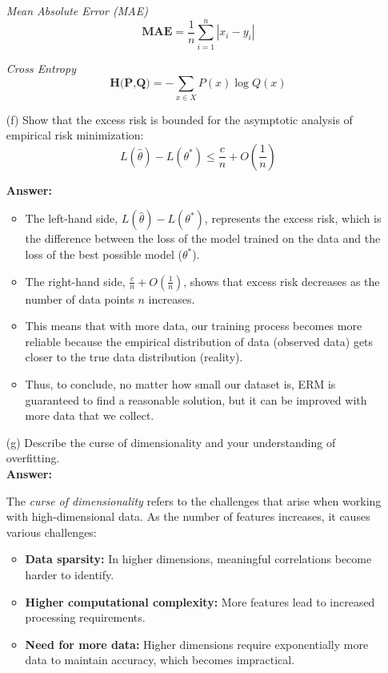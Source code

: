 \documentclass[12pt,letterpaper]{article}
\begin{document}
\begin{itemize}
    \textit{Mean Absolute Error (MAE)}
    \[
        \textbf{MAE} = \frac{1}{n}\sum_{i=1}^{n} \left\lvert x_i - y_i \right\rvert 
    \]
    
    \textit{Cross Entropy}
    \[
        \textbf{H(P,Q)} = -\sum_{x \in X} P(x) \log Q(x)
    \]
    
    \item[(f)] Show that the excess risk is bounded for the asymptotic analysis of empirical risk minimization:
    \[
        L(\hat{\theta}) - L(\theta^*) \leq \frac{c}{n} + O(\frac{1}{n})
    \]
    
    \textbf{Answer:}
    \begin{itemize}
        \item The left-hand side, \(L(\hat{\theta}) - L(\theta^*)\), represents the excess risk, which is the difference between the loss of the model trained on the data and the loss of the best possible model (\(\theta^*\)).
        \item The right-hand side, \(\frac{c}{n} + O(\frac{1}{n})\), shows that excess risk decreases as the number of data points \(n\) increases.
        \item This means that with more data, our training process becomes more reliable because the empirical distribution of data (observed data) gets closer to the true data distribution (reality).
        \item Thus, to conclude, no matter how small our dataset is, ERM is guaranteed to find a reasonable solution, but it can be improved with more data that we collect.
    \end{itemize}
    
    \item[(g)] Describe the curse of dimensionality and your understanding of overfitting.
    \vspace{1.0cm}
    \\
    \textbf{Answer:} 
    
    The \textit{curse of dimensionality} refers to the challenges that arise when working with high-dimensional data. As the number of features increases, it causes various challenges:
    \begin{itemize}
        \item \textbf{Data sparsity:} In higher dimensions, meaningful correlations become harder to identify.
        \item \textbf{Higher computational complexity:} More features lead to increased processing requirements.
        \item \textbf{Need for more data:} Higher dimensions require exponentially more data to maintain accuracy, which becomes impractical.
    \end{itemize}
    

\end{itemize}
\end{document}
